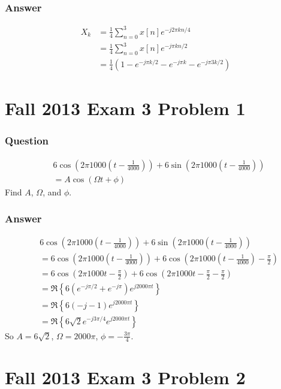 \documentclass{beamer}
\begin{document}
\begin{frame}
  \frametitle{Answer}
  \begin{align*}
    X_k &= \frac{1}{4}\sum_{n=0}^3 x[n]e^{-j2\pi kn/4}\\
    &= \frac{1}{4}\sum_{n=0}^3 x[n]e^{-j\pi kn/2}\\
    &= \frac{1}{4}\left(1 - e^{-j\pi k/2}-e^{-j\pi k}-e^{-j\pi 3k/2}\right)
  \end{align*}
\end{frame}

\section[13x3p1]{Fall 2013 Exam 3 Problem 1}
\setcounter{subsection}{1}

\begin{frame}
  \frametitle{Question}
  \begin{align*}
    &6\cos\left(2\pi 1000\left(t-\frac{1}{4000}\right)\right)+6\sin\left(2\pi 1000\left(t-\frac{1}{4000}\right)\right)\\
    &=A\cos(\Omega t+\phi)
  \end{align*}
  Find $A$, $\Omega$, and $\phi$.
\end{frame}


\begin{frame}
  \frametitle{Answer}
  \begin{align*}
    &
    6\cos\left(2\pi 1000\left(t-\frac{1}{4000}\right)\right)+6\sin\left(2\pi 1000\left(t-\frac{1}{4000}\right)\right)\\
    &=6\cos\left(2\pi 1000\left(t-\frac{1}{4000}\right)\right)+6\cos\left(2\pi 1000\left(t-\frac{1}{4000}\right)-\frac{\pi}{2}\right)\\
    &=
    6\cos\left(2\pi 1000t-\frac{\pi}{2}\right)+6\cos\left(2\pi 1000t-\frac{\pi}{2}-\frac{\pi}{2}\right)\\
    &=\Re\left\{6(e^{-j\pi/2}+e^{-j\pi})e^{j2000\pi t}\right\}\\
    &=\Re\left\{6(-j-1)e^{j2000\pi t}\right\}\\
    &=\Re\left\{6\sqrt{2}e^{-j3\pi/4}e^{j2000\pi t}\right\}
  \end{align*}
  So $A=6\sqrt{2}$, $\Omega=2000\pi$, $\phi=-\frac{3\pi}{4}$.
\end{frame}

\section[13x3p2]{Fall 2013 Exam 3 Problem 2}
\setcounter{subsection}{1}
\end{document}

